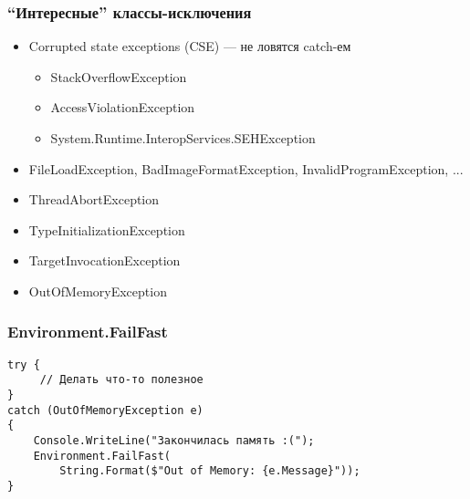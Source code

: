 \documentclass[xetex,mathserif,serif]{beamer}
\begin{document}
	\begin{frame}
		\frametitle{``Интересные'' классы-исключения}
		\begin{itemize}
			\item Corrupted state exceptions (CSE) --- не ловятся catch-ем
			\begin{itemize}
				\item StackOverflowException
				\item AccessViolationException
				\item System.Runtime.InteropServices.SEHException
			\end{itemize}
			\item FileLoadException, BadImageFormatException, InvalidProgramException, ...
			\item ThreadAbortException
			\item TypeInitializationException
			\item TargetInvocationException
			\item OutOfMemoryException
		\end{itemize}
	\end{frame}

	\begin{frame}[fragile]
		\frametitle{Environment.FailFast}
		\begin{verbatim}
try {
     // Делать что-то полезное
}
catch (OutOfMemoryException e) 
{
    Console.WriteLine("Закончилась память :(");
    Environment.FailFast(
        String.Format($"Out of Memory: {e.Message}"));
}
		\end{verbatim}
	\end{frame}
\end{document}
